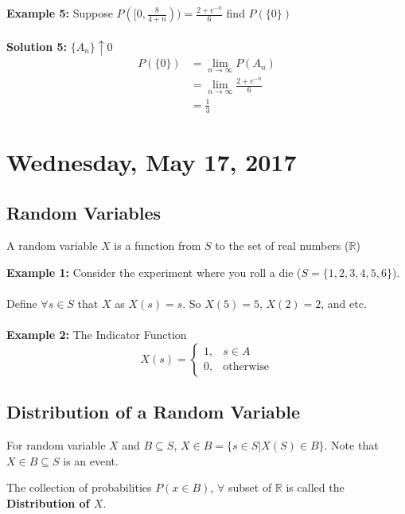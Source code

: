 \documentclass[12pt, twoside]{article}
\begin{document}
\textbf{Example 5:} Suppose $P([0,\frac{8}{4+n})) = \frac{2 + e^{-n}}{6}$ find $P(\{ 0 \})$\\\\
\textbf{Solution 5:} $\{A_n\}\uparrow 0$\\
\begin{align*}
	P(\{ 0 \}) &= \lim_{n\to\infty} P(A_n)\\
	&= \lim_{n\to\infty} \frac{2 + e^{-n}}{6}\\
	&= \frac{1}{3}
\end{align*}

\section{Wednesday, May 17, 2017}

\subsection{Random Variables}

\begin{tcolorbox}[title=Definition: Random Variables]
	A random variable $X$ is a function from $S$ to the set of real numbers ($\mathbb{R}$)
\end{tcolorbox}

\textbf{Example 1:} Consider the experiment where you roll a die ($S = \{ 1,2,3,4,5,6 \}$).\\
\\
Define $\forall s\in S$ that $X$ as $X(s) = s$. So $X(5) = 5$, $X(2) = 2$, and etc.
\\
\\
\textbf{Example 2:} The Indicator Function\\
$$X(s) =
\begin{cases}
	1, & s \in A\\
	0, & \text{otherwise}
\end{cases}
$$

\subsection{Distribution of a Random Variable}

\begin{tcolorbox}
	For random variable $X$ and $B \subseteq S$, $X \in B = \{ s \in S | X(S) \in B \}$. Note that $X \in B \subseteq S$ is an event.
\end{tcolorbox}

\begin{tcolorbox}[title=Definition: The Distribution of a Random Variable $X$]
	The collection of probabilities $P(x \in B)$, $\forall$ subset of $\mathbb{R}$ is called the \textbf{Distribution of $X$}.
\end{tcolorbox}
\end{document}
